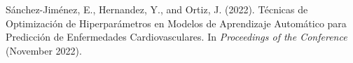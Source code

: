 \newpage
\medskip
\begin{thebibliography}{30}



Sánchez-Jiménez, E., Hernandez, Y., and Ortiz, J. (2022). 
Técnicas de Optimización de Hiperparámetros en Modelos de Aprendizaje Automático para Predicción de Enfermedades Cardiovasculares. 
In \textit{Proceedings of the Conference} (November 2022).



\end{thebibliography}

